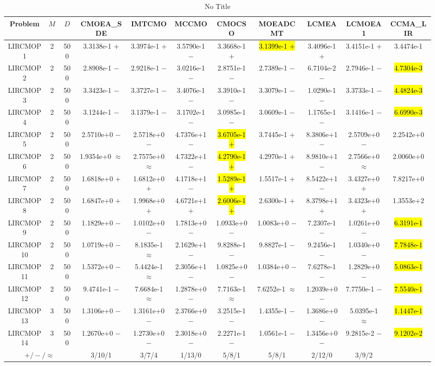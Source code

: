 \documentclass[journal]{IEEEtran}
\begin{document}
\begin{table}[htbp]
\renewcommand{\arraystretch}{1.2}
\centering
\caption{No Title}
\begin{tabular}{ccccccccccc}
\toprule
Problem&$M$&$D$&CMOEA\_SDE&IMTCMO&MCCMO&CMOCSO&MOEADCMT&LCMEA&LCMOEA1&CCMA\_LIR\\
\midrule
\multirow{1}{*}{LIRCMOP1}&2&500&3.3138e-1 $+$&3.3974e-1 $+$&3.5790e-1 $-$&3.3668e-1 $+$&\hl{3.1399e-1 $+$}&3.4096e-1 $+$&3.4151e-1 $+$&3.4474e-1\\
\hline
\multirow{1}{*}{LIRCMOP2}&2&500&2.8908e-1 $-$&2.9218e-1 $-$&3.0216e-1 $-$&2.8751e-1 $-$&2.7389e-1 $-$&6.7104e-2 $-$&2.7946e-1 $-$&\hl{4.7304e-3}\\
\hline
\multirow{1}{*}{LIRCMOP3}&2&500&3.3423e-1 $-$&3.3727e-1 $-$&3.4076e-1 $-$&3.3910e-1 $-$&3.3079e-1 $-$&1.0290e-1 $-$&3.3733e-1 $-$&\hl{4.4824e-3}\\
\hline
\multirow{1}{*}{LIRCMOP4}&2&500&3.1244e-1 $-$&3.1379e-1 $-$&3.1702e-1 $-$&3.0985e-1 $-$&3.0609e-1 $-$&1.1765e-1 $-$&3.1416e-1 $-$&\hl{6.6990e-3}\\
\hline
\multirow{1}{*}{LIRCMOP5}&2&500&2.5710e+0 $-$&2.5718e+0 $-$&4.7376e+1 $-$&\hl{3.6705e-1 $+$}&3.7445e-1 $+$&8.3806e+1 $-$&2.5709e+0 $-$&2.2542e+0\\
\hline
\multirow{1}{*}{LIRCMOP6}&2&500&1.9354e+0 $\approx$&2.7575e+0 $\approx$&4.7322e+1 $-$&\hl{4.2790e-1 $+$}&4.2970e-1 $+$&8.9810e+1 $-$&2.7566e+0 $\approx$&2.0060e+0\\
\hline
\multirow{1}{*}{LIRCMOP7}&2&500&1.6818e+0 $+$&1.6812e+0 $+$&4.1718e+1 $-$&\hl{1.5289e-1 $+$}&1.5517e-1 $+$&8.5422e+1 $-$&3.4327e+0 $+$&7.8217e+0\\
\hline
\multirow{1}{*}{LIRCMOP8}&2&500&1.6847e+0 $+$&1.9968e+0 $+$&4.6721e+1 $+$&\hl{2.6006e-1 $+$}&2.6300e-1 $+$&8.3798e+1 $+$&3.4323e+0 $+$&1.3553e+2\\
\hline
\multirow{1}{*}{LIRCMOP9}&2&500&1.1829e+0 $-$&1.0102e+0 $-$&1.7813e+0 $-$&1.0933e+0 $-$&1.0083e+0 $-$&7.2307e-1 $-$&1.0261e+0 $-$&\hl{6.3191e-1}\\
\hline
\multirow{1}{*}{LIRCMOP10}&2&500&1.0719e+0 $-$&8.1835e-1 $\approx$&2.1629e+1 $-$&9.8288e-1 $-$&9.8827e-1 $-$&9.2456e-1 $-$&1.0340e+0 $-$&\hl{7.7848e-1}\\
\hline
\multirow{1}{*}{LIRCMOP11}&2&500&1.5372e+0 $-$&5.4424e-1 $\approx$&2.3056e+1 $-$&1.0825e+0 $-$&1.0384e+0 $-$&7.6278e-1 $-$&1.2829e+0 $-$&\hl{5.0863e-1}\\
\hline
\multirow{1}{*}{LIRCMOP12}&2&500&9.4741e-1 $-$&7.6684e-1 $\approx$&1.2878e+0 $-$&7.7163e-1 $\approx$&7.6252e-1 $\approx$&1.2039e+0 $-$&7.7750e-1 $-$&\hl{7.5540e-1}\\
\hline
\multirow{1}{*}{LIRCMOP13}&3&500&1.3106e+0 $-$&1.3161e+0 $-$&2.3766e+0 $-$&3.2515e-1 $-$&1.4355e-1 $-$&1.3686e+0 $-$&5.0395e-1 $\approx$&\hl{1.1447e-1}\\
\hline
\multirow{1}{*}{LIRCMOP14}&3&500&1.2670e+0 $-$&1.2730e+0 $-$&2.3018e+0 $-$&2.2271e-1 $-$&1.0561e-1 $-$&1.3456e+0 $-$&9.2815e-2 $-$&\hl{9.1202e-2}\\
\hline
\multicolumn{3}{c}{$+/-/\approx$}&3/10/1&3/7/4&1/13/0&5/8/1&5/8/1&2/12/0&3/9/2&\\
\bottomrule
\end{tabular}
\label{No Label}
\end{table}
\end{document}
